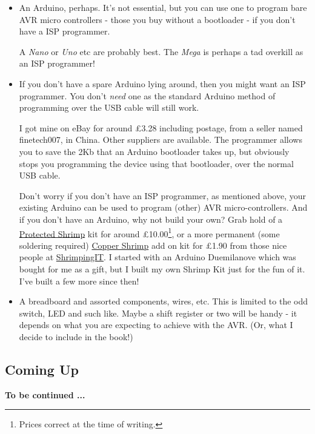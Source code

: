 \begin{itemize}
\item
  An  Arduino, perhaps. It's not essential, but you can use one to program bare AVR micro controllers - those you buy without a bootloader -   if you don't have a ISP programmer.
  
  A \emph{Nano} or \emph{Uno} etc are probably best. The \emph{Mega} is perhaps a tad overkill as an ISP programmer!
\item
  If you don't have a spare  Arduino lying around, then you might want an ISP programmer. You don't \emph{need} one as the standard  Arduino method of programming over the USB cable will still work.
  
  I got mine on eBay for around £3.28 including postage, from a seller named finetech007, in China. Other suppliers are available. The programmer allows you to save the 2Kb that an  Arduino bootloader takes up, but obviously stops you programming the device using that bootloader, over the normal USB cable.

  Don't worry if you don't have an ISP programmer, as mentioned above, your existing  Arduino can be used to program (other) AVR   micro-controllers. And if you don't have an  Arduino, why not build your own? Grab hold of a \href{http://start.shrimping.it/project/protected/build.html}{Protected Shrimp} kit for around £10.00\footnote{Prices correct at the time of writing.}, or a more permanent (some soldering required) \href{http://start.shrimping.it/kit/stripboard.html}{Copper Shrimp} add on kit for £1.90 from those nice people at \href{http://start.shrimping.it//index.html}{ShrimpingIT}. I started with an Arduino Duemilanove which was bought for me as a gift, but I built my own Shrimp Kit just for the fun of it. I've built a few more since then!
\item
  A breadboard and assorted components, wires, etc. This is limited to the odd switch, LED and such like. Maybe a shift register or two will be handy - it depends on what you are expecting to achieve with the   AVR. (Or, what I decide to include in the book!)
\end{itemize}

\subsection*{Coming Up}\label{coming-up}

\textbf{To be continued ...}

